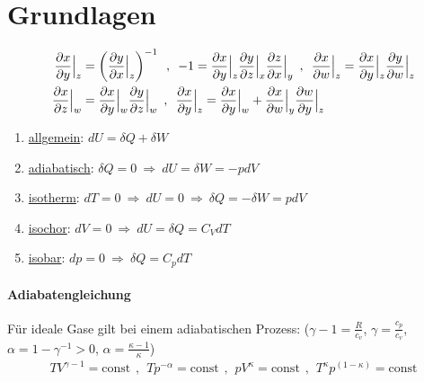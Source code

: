 \section{Grundlagen}

\begin{align*}
    \frac{\partial x}{\partial y} \Big|_z
    &= \left( \frac{\partial y}{\partial x} \Big|_z \right)^{-1}
    \hspace{5pt} , \hspace{5pt}
    - 1 = \frac{\partial x}{\partial y} \Big|_z \frac{\partial y}{\partial z} \Big|_x \frac{\partial z}{\partial x} \Big|_y
    \hspace{5pt} , \hspace{5pt}
    \frac{\partial x}{\partial w} \Big|_z = \frac{\partial x}{\partial y} \Big|_z \frac{\partial y}{\partial w} \Big|_z
    \\
    \frac{\partial x}{\partial z} \Big|_w &= \frac{\partial x}{\partial y} \Big|_w \frac{\partial y}{\partial z} \Big|_w
    \hspace{5pt} , \hspace{5pt}
    \frac{\partial x}{\partial y} \Big|_z = \frac{\partial x}{\partial y} \Big|_w + \frac{\partial x}{\partial w} \Big|_y \frac{\partial w}{\partial y} \Big|_z
\end{align*}

\begin{enumerate}[]
    \item \underline{allgemein}: $dU = \delta Q + \delta W$
    \item \underline{adiabatisch}: $\delta Q = 0 \ \Rightarrow \ dU = \delta W = - p dV$
    \item \underline{isotherm}: $dT = 0 \ \Rightarrow \ dU = 0 \ \Rightarrow \ \delta Q = - \delta W = p dV$
    \item \underline{isochor}: $d V = 0 \ \Rightarrow \ dU = \delta Q = C_V dT$
    \item \underline{isobar}: $dp = 0 \ \Rightarrow \ \delta Q = C_p dT$ 
\end{enumerate}

\paragraph{Adiabatengleichung}
Für ideale Gase gilt bei einem adiabatischen Prozess:
($\gamma - 1 = \frac{R}{c_v}$, $\gamma = \frac{c_p}{c_v}$, $\alpha = 1 - \gamma^{-1} > 0$,
$\alpha = \frac{\kappa - 1}{\kappa}$)
\begin{align*}
    T V^{\gamma - 1} = \text{const}
    \hspace{5pt} , \hspace{5pt}
    T p^{-\alpha} = \text{const}
    \hspace{5pt} , \hspace{5pt}
    p V^\kappa = \text{const}
    \hspace{5pt} , \hspace{5pt}
    T^\kappa p^{(1-\kappa)} = \text{const}
\end{align*}

